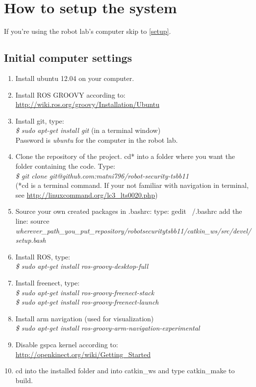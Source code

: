 \documentclass[10pt,a4paper]{article}
\begin{document}
\section{How to setup the system}
If you're using the robot lab's computer skip to \ref{setup}.
\subsection{Initial computer settings}

\begin{enumerate}
\item Install ubuntu 12.04 on your computer.
\item Install ROS GROOVY according to: \url{http://wiki.ros.org/groovy/Installation/Ubuntu}
\item Install git, type:\\
\textit{
\$ sudo apt-get install git} (in a terminal window)\\
Password is \textit{ubuntu} for the computer in the robot lab.
\item Clone the repository of the project.
cd* into a folder where you want the folder containing the code.
Type:\\
\textit{\$ git clone git@github.com:matni796/robot-security-tsbb11}\\
(*cd is a terminal command. If your not familiar with navigation in terminal, see \url{http://linuxcommand.org/lc3\_lts0020.php})

\item Source your own created packages in .bashrc:
	type: gedit ~/.bashrc
add the line:
source \textit{wherever\_path\_you\_put\_repository/robot\-security\-tsbb11/catkin\_ws/src/devel/setup.bash}

\item Install ROS, type: \\
\textit{\$ sudo apt-get install ros-groovy-desktop-full}

\item Install freenect, type: \\
\textit{
\$ sudo apt-get install ros-groovy-freenect-stack\\
\$ sudo apt-get install ros-groovy-freenect-launch
}

\item Install arm navigation (used for visualization)\\
\textit{\$ sudo apt-get install ros-groovy-arm-navigation-experimental}

\item Disable gspca kernel according to:
	\url{http://openkinect.org/wiki/Getting\_Started}


\item cd into the installed folder and into catkin\_ws and type catkin\_make to build.
\end{enumerate}
\end{document}
